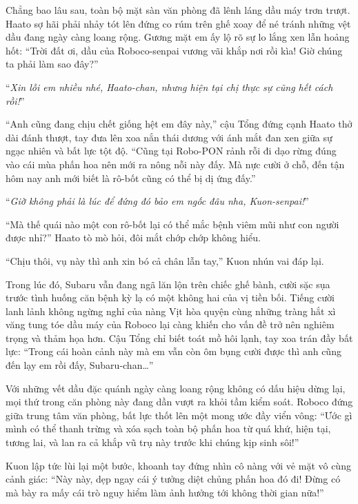 \documentclass[../main.tex]{subfiles}
\begin{document}
Chẳng bao lâu sau, toàn bộ mặt sàn văn phòng đã lênh láng dầu máy trơn trượt. Haato sợ hãi phải nhảy tót lên đứng co rúm trên ghế xoay để né tránh những vệt dầu đang ngày càng loang rộng. Gương mặt em ấy lộ rõ sự lo lắng xen lẫn hoảng hốt: ``Trời đất ơi, dầu của Roboco-senpai vương vãi khắp nơi rồi kìa! Giờ chúng ta phải làm sao đây?''

``\textit{Xin lỗi em nhiều nhé, Haato-chan, nhưng hiện tại chị thực sự cũng hết cách rồi!}''

``Anh cũng đang chịu chết giống hệt em đây này,'' cậu Tổng đứng cạnh Haato thở dài đánh thượt, tay đưa lên xoa nắn thái dương với ánh mắt đan xen giữa sự ngạc nhiên và bất lực tột độ. ``Cũng tại Robo-PON rảnh rỗi đi dạo rừng đúng vào cái mùa phấn hoa nên mới ra nông nỗi này đấy. Mà nực cười ở chỗ, đến tận hôm nay anh mới biết là rô-bốt cũng có thể bị dị ứng đấy.''

``\textit{Giờ không phải là lúc để đứng đó bảo em ngốc đâu nha, Kuon-senpai!}''

\pov{-}

``Mà thế quái nào một con rô-bốt lại có thể mắc bệnh viêm mũi như con người được nhỉ?'' Haato tò mò hỏi, đôi mắt chớp chớp không hiểu.

``Chịu thôi, vụ này thì anh xin bó cả chân lẫn tay,'' Kuon nhún vai đáp lại.

Trong lúc đó, Subaru vẫn đang ngã lăn lộn trên chiếc ghế bành, cười sặc sụa trước tình huống căn bệnh kỳ lạ có một không hai của vị tiền bối. Tiếng cười lanh lảnh không ngừng nghỉ của nàng Vịt hòa quyện cùng những tràng hắt xì văng tung tóe dầu máy của Roboco lại càng khiến cho vấn đề trở nên nghiêm trọng và thảm họa hơn. Cậu Tổng chỉ biết toát mồ hôi lạnh, tay xoa trán đầy bất lực: ``Trong cái hoàn cảnh này mà em vẫn còn ôm bụng cười được thì anh cũng đến lạy em rồi đấy, Subaru-chan\dots''


Với những vết dầu đặc quánh ngày càng loang rộng không có dấu hiệu dừng lại, mọi thứ trong căn phòng này đang dần vượt ra khỏi tầm kiểm soát. Roboco đứng giữa trung tâm văn phòng, bất lực thốt lên một mong ước đầy viển vông: ``Ước gì mình có thể thanh trừng và xóa sạch toàn bộ phấn hoa từ quá khứ, hiện tại, tương lai, và lan ra cả khắp vũ trụ này trước khi chúng kịp sinh sôi!''

Kuon lập tức lùi lại một bước, khoanh tay đứng nhìn cô nàng với vẻ mặt vô cùng cảnh giác: ``Này này, dẹp ngay cái ý tưởng diệt chủng phấn hoa đó đi! Đừng có mà bày ra mấy cái trò nguy hiểm làm ảnh hưởng tới không thời gian nữa!''
\end{document}

